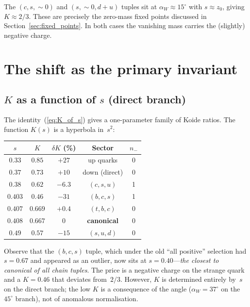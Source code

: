 \documentclass[preprint,12pt]{elsarticle}
\begin{document}
\noindent The $(c,s,{\sim}0)$ and $(s,{\sim}0,d{+}u)$ tuples
sit at $\alpha_W \approx 15^\circ$ with $s \approx z_0$, giving
$K \approx 2/3$.  These are precisely the zero-mass fixed points
discussed in Section~\ref{sec:fixed_points}.
In both cases the vanishing mass carries the (slightly) negative
charge.


\section{The shift as the primary invariant}
\label{sec:shift}

\subsection{$K$ as a function of $s$ (direct branch)}

The identity~(\ref{eq:K_of_s}) gives a one-parameter family
of Koide ratios.  The function $K(s)$ is a
hyperbola in~$s^2$:

\begin{center}
\begin{tabular}{ccccc}
\toprule
$s$ & $K$ & $\delta K$ (\%) & Sector & $n_-$ \\
\midrule
$0.33$  & $0.85$ & $+27$ & up quarks & 0 \\
$0.37$  & $0.73$ & $+10$ & down (direct) & 0 \\
$0.38$  & $0.62$ & $-6.3$ & $(c,s,u)$ & 1 \\
$0.403$ & $0.46$ & $-31$ & $(b,c,s)$ & 1 \\
$0.407$ & $0.669$ & $+0.4$ & $(t,b,c)$ & 0 \\
$0.408$ & $0.667$ & $0$ & \textbf{canonical} & 0 \\
$0.49$  & $0.57$ & $-15$ & $(s,u,d)$ & 0 \\
\bottomrule
\end{tabular}
\end{center}

\noindent Observe that the $(b,c,s)$ tuple, which under the old
``all positive'' selection had $s = 0.67$ and appeared as an
outlier, now sits at $s = 0.40$---\emph{the closest to canonical
of all chain tuples}.  The price is a negative charge on the
strange quark and a $K = 0.46$ that deviates from~$2/3$.
However, $K$ is determined entirely by~$s$ on the direct branch;
the low $K$ is a consequence of the angle ($\alpha_W = 37^\circ$
on the~$45^\circ$ branch), not of anomalous normalisation.
\end{document}
